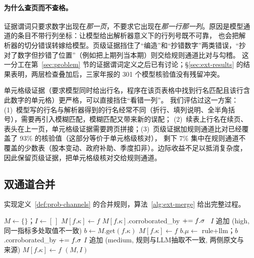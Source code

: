 \paragraph{为什么查页而不查格。}
证据谓词只要求数字出现在\emph{那一页}，不要求它出现在\emph{那一行那一列}。原因是模型通道的条目不带行列坐标：让模型给出解析器意义下的行列号既不可靠，
也会把解析器的切分错误转嫁给模型。页级证据挡住了“编造”和“抄错数字”两类错误，“抄对了数字但抄错了位置”（例如把上期列当本期）则交给规则通道比对与勾稽。
这一分工在第~\ref{sec:problem} 节的证据谓词定义之后已有讨论；\S\ref{sec:ext-results} 的结果表明，两层检查叠加后，三家年报的 301 个模型核验值没有残留冲突。

\begin{tradeoff}
单元格级证据（要求模型同时给出行名，程序在该页表格中找到行名匹配且该行含此数字的单元格）更严格，可以直接挡住“看错一列”。
我们评估过这一方案：(1)~模型写的行名与解析器得到的行名经常不同（折行、填列说明、全半角括号），需要再引入模糊匹配，模糊匹配又带来新的误配；
(2)~续表上行名在续页、表头在上一页，单元格级证据需要跨页拼接；(3)~页级证据加规则通道比对已经覆盖了 93\% 的核验值（这部分等价于单元格级核对），
剩下 7\% 集中在规则通道不覆盖的少数表（股本变动、政府补助、季度扣非）。边际收益不足以抵消复杂度，因此保留页级证据，把单元格级核对交给规则通道。
\end{tradeoff}

\subsection{双通道合并}
\label{sec:ext-merge}

 实现定义~\ref{def:prob-channels} 的合并规则，算法~\ref{alg:ext-merge} 给出完整过程。

\begin{algorithm}[t]
\caption{双通道合并 （流水线中 prefer = llm）}
\label{alg:ext-merge}
\begin{algorithmic}[1]
  \State $M\gets\{\}$；$I\gets[\,]$
   
     $M[f.\kappa]\gets f$
     $M[f.\kappa]$.corroborated\_by $\mathrel{+}= f.\sigma$
    \Else\ $I$ 追加 (high, 同一指标多处取值不一致)
    \EndIf
  \EndFor
   
    \State $b\gets M.\text{get}(f.\kappa)$
     $M[f.\kappa]\gets f$ 
     $b.\mu\gets$ rule+llm；$b$.corroborated\_by $\mathrel{+}= f.\sigma$
    \Else
      \State $I$ 追加 (medium, 规则与LLM抽取不一致, 两侧原文与来源)
       $M[f.\kappa]\gets f$ \EndIf
    \EndIf
  \EndFor
  \State \Return $(M, I)$
\EndFunction
\end{algorithmic}
\end{algorithm}

